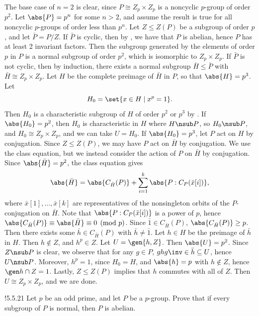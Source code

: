 \begin{sol}
    The base case of $n = 2$ is clear, since $P \cong Z_p \times Z_p$ is a noncyclic $p$-group of order $p^2$.
	Let $\abs{P} = p^n$ for some $n > 2$, and assume the result is true for all noncyclic $p$-groups of order less than $p^n$.
	Let $Z \leq Z(P)$ be a subgroup of order $p$, and let $\bar P = P/Z$.
	If $\bar P$ is cyclic, then by , we have that $P$ is abelian, hence $P$ has at least 2 invariant factors.
	Then the subgroup generated by the elements of order $p$ in $P$ is a normal subgroup of order $p^2$, which is isomorphic to $Z_p \times Z_p$.
	If $\bar P$ is not cyclic, then by induction, there exists a normal subgroup $\bar H \leq \bar P$ with $\bar H \cong Z_p \times Z_p$.
	Let $H$ be the complete preimage of $\bar H$ in $P$, so that $\abs{H} = p^3$.
	Let
    \[
    	H_0 = \set{x \in H \mid x^p = 1}.
    \]
    Then $H_0$ is a characteristic subgroup of $H$ of order $p^2$ or $p^3$ by .
	If $\abs{H_0} = p^2$, then $H_0$ is characteristic in $H$ where $H \nsub P$, so $H_0 \nsub P$, and $H_0 \cong Z_p \times Z_p$, and we can take $U = H_0$.
	If $\abs{H_0} = p^3$, let $P$ act on $H$ by conjugation.
	Since $Z \leq Z(P)$, we may have $P$ act on $\bar H$ by conjugation.
	We use the class equation, but we instead consider the action of $P$ on $\bar H$ by conjugation.
	Since $\abs{\bar H} = p^2$, the class equation gives
    \[
    	\abs{\bar H} = \abs{C_{\bar H}(P)} + \sum_{i = 1}^k \abs{P : C_P(\bar x[i])},
    \]
    where $\bar x[1], \ldots, \bar x[k]$ are representatives of the nonsingleton orbits of the $P$-conjugation on $\bar H$.
	Note that $\abs{P : C_P(\bar x[i])}$ is a power of $p$, hence $\abs{C_{\bar H}(P)} \equiv \abs{\bar H} \equiv 0 \pmod p$.
	Since $\bar 1 \in C_{\bar H}(P)$, $\abs{C_{\bar H}(P)} \geq p$.
	Then there exists some $\bar h \in C_{\bar H}(P)$ with $\bar h \neq \bar 1$.
	Let $h \in H$ be the preimage of $\bar h$ in $H$.
	Then $h \notin Z$, and $h^p \in Z$.
	Let $U = \gen{h, Z}$.
	Then $\abs{U} = p^2$.
	Since $Z \nsub P$ is clear, we observe that for any $g \in P$, $ghg\inv \in \bar h \subseteq U$, hence $U \nsub P$.
	Moreover, $h^p = 1$, since $H_0 = H$, and $\abs{h} = p$ with $h \notin Z$, hence $\gen h \cap Z = 1$.
	Lastly, $Z \leq Z(P)$ implies that $h$ commutes with all of $Z$.
	Then $U \cong Z_p \times Z_p$, and we are done.
\end{sol}

\begin{exercise}!{5.5.21}
    Let $p$ be an odd prime, and let $P$ be a $p$-group.
	Prove that if every subgroup of $P$ is normal, then $P$ is abelian.
    
\end{exercise}

